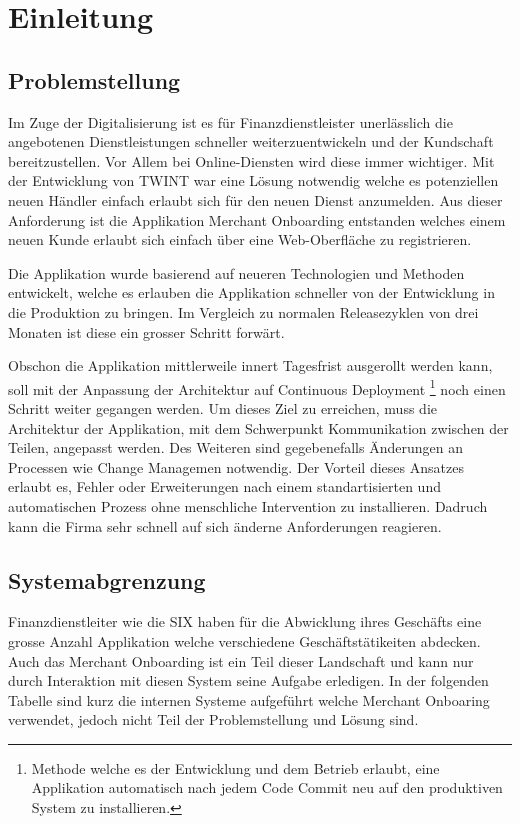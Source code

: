 \chapter{Einleitung}

\section{Problemstellung}

Im Zuge der Digitalisierung ist es für Finanzdienstleister unerlässlich die angebotenen Dienstleistungen schneller weiterzuentwickeln und der Kundschaft bereitzustellen. Vor Allem bei Online-Diensten wird diese immer wichtiger. Mit der Entwicklung von TWINT war eine Lösung notwendig welche es potenziellen neuen Händler einfach erlaubt sich für den neuen Dienst anzumelden. Aus dieser Anforderung ist die Applikation Merchant Onboarding entstanden welches einem neuen Kunde erlaubt sich einfach über eine Web-Oberfläche zu registrieren.

Die Applikation wurde basierend auf neueren Technologien und Methoden entwickelt, welche es erlauben die Applikation schneller von der Entwicklung in die Produktion zu bringen. Im Vergleich zu normalen Releasezyklen von drei Monaten ist diese ein grosser Schritt forwärt.

Obschon die Applikation mittlerweile innert Tagesfrist ausgerollt werden kann, soll mit der Anpassung der Architektur auf Continuous Deployment \footnote{Methode welche es der Entwicklung und dem Betrieb erlaubt, eine Applikation automatisch nach jedem Code Commit neu auf den produktiven System zu installieren.} noch einen Schritt weiter gegangen werden. Um dieses Ziel zu erreichen, muss die Architektur der Applikation, mit dem Schwerpunkt Kommunikation zwischen der Teilen, angepasst werden. Des Weiteren sind gegebenefalls Änderungen an Processen wie Change Managemen notwendig.
Der Vorteil dieses Ansatzes erlaubt es, Fehler oder Erweiterungen nach einem standartisierten und automatischen Prozess ohne menschliche Intervention zu installieren. Dadruch kann die Firma sehr schnell auf sich änderne Anforderungen reagieren.


\section{Systemabgrenzung}
\label{Abgrenzung}

Finanzdienstleiter wie die SIX haben für die Abwicklung ihres Geschäfts eine grosse Anzahl Applikation welche verschiedene Geschäftstätikeiten abdecken. Auch das Merchant Onboarding ist ein Teil dieser Landschaft und kann nur durch Interaktion mit diesen System seine Aufgabe erledigen. In der folgenden Tabelle sind kurz die internen Systeme aufgeführt welche Merchant Onboaring verwendet, jedoch nicht Teil der Problemstellung und Lösung sind.

